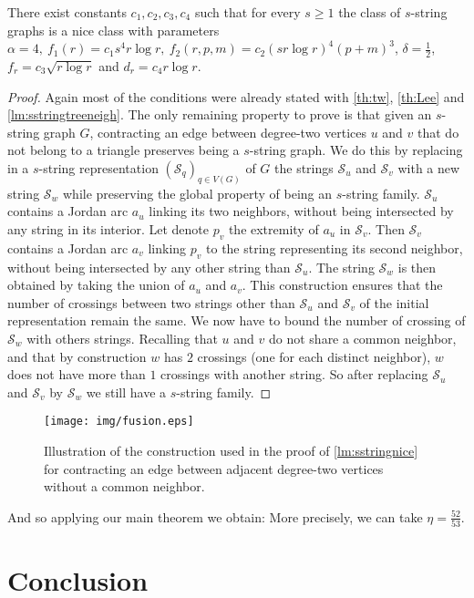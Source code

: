 \documentclass{amsart}
\newcommand{\mS}{\mathcal{S}}
\begin{document}
\begin{lemma}\label{lm:sstringnice}
    There exist constants $c_1,c_2,c_3,c_4$ such that for every $s\geq 1$ the class of $s$-string graphs is a nice class with parameters $\alpha=4,~f_1(r)=c_1s^4r\log r,~f_2(r,p,m)=c_2(sr\log r)^4(p+m)^3$, $\delta=\frac 12$, $f_r=c_3\sqrt{r\log r}$ and $d_r=c_4r\log r$.
\end{lemma}
\begin{proof}
Again most of the conditions were already stated with \autoref{th:tw}, \autoref{th:Lee} and \autoref{lm:sstringtreeneigh}. The only remaining property to prove is that given an $s$-string graph $G$, contracting an edge between degree-two vertices $u$ and $v$ that do not belong to a triangle preserves being a $s$-string graph. We do this by replacing in a $s$-string representation $(\mS_q)_{q\in V(G)}$ of $G$ the strings $\mS_u$ and $\mS_v$ with a new string $\mS_w$ while preserving the global property of being an $s$-string family.  $\mS_u$ contains a Jordan arc $a_u$ linking its two neighbors, without being intersected by any string in its interior. Let denote $p_v$ the extremity of $a_u$ in $\mS_v$. Then $\mS_v$ contains a Jordan arc $a_v$ linking $p_v$ to the string representing its second neighbor, without being intersected by any other string than $\mS_u$. The string $\mS_w$ is then obtained by taking the union of $a_u$ and $a_v$. This construction ensures that the number of crossings between two strings other than $\mS_u$ and $\mS_v$ of the initial representation remain the same. We now have to bound the number of crossing of $\mS_w$ with others strings.
Recalling that $u$ and $v$ do not share a common neighbor, and that by construction $w$ has $2$ crossings (one for each distinct neighbor), $w$ does not have more than $1$ crossings with another string. So after replacing $\mS_u$ and $\mS_v$ by $\mS_w$ we still have a $s$-string family.
\end{proof}
\begin{figure}
    \centering
    \texttt{[image: img/fusion.eps]}
    \caption{Illustration of the construction used in the proof of \autoref{lm:sstringnice} for contracting an edge between adjacent degree-two vertices without a common neighbor.}
    \label{fig:rule2}
\end{figure}

And so applying our main theorem we obtain:
\maincor*
More precisely, we can take $\eta=\frac{52}{53}$.



\section{Conclusion}\label{sec:ccl}
\end{document}
